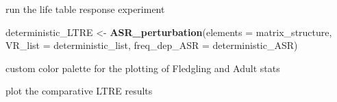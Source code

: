 \documentclass[]{article}
\newenvironment{Shaded}{\begin{snugshade}}{\end{snugshade}}
\newcommand{\KeywordTok}[1]{\textcolor[rgb]{0.13,0.29,0.53}{\textbf{{#1}}}}
\newcommand{\DataTypeTok}[1]{\textcolor[rgb]{0.13,0.29,0.53}{{#1}}}
\newcommand{\StringTok}[1]{\textcolor[rgb]{0.31,0.60,0.02}{{#1}}}
\newcommand{\NormalTok}[1]{{#1}}
\begin{document}
run the life table response experiment

\begin{Shaded}
\begin{Highlighting}[]
\NormalTok{deterministic_LTRE <-}\StringTok{ }
\StringTok{  }\KeywordTok{ASR_perturbation}\NormalTok{(}\DataTypeTok{elements =} \NormalTok{matrix_structure,}
                   \DataTypeTok{VR_list =} \NormalTok{deterministic_list, }
                   \DataTypeTok{freq_dep_ASR =} \NormalTok{deterministic_ASR)}
\end{Highlighting}
\end{Shaded}

custom color palette for the plotting of Fledgling and Adult stats

\begin{Shaded}
\end{Shaded}

plot the comparative LTRE results
\end{document}
